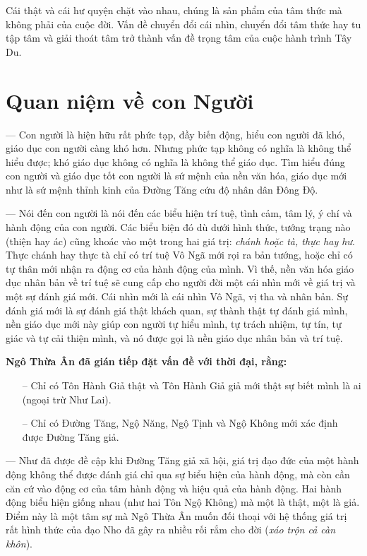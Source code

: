 Cái thật và cái hư quyện chặt vào nhau, chúng là sản phẩm của tâm thức mà không phải của cuộc đời. Vấn đề chuyển đổi cái nhìn, chuyển đổi tâm thức hay tu tập tâm và giải thoát tâm trở thành vấn đề trọng tâm của cuộc hành trình Tây Du.

\section{Quan niệm về con Người} %
\label{sec:56_57_con_nguoi}

— Con người là hiện hữu rất phức tạp, đầy biến động, hiểu con người đã khó, giáo dục con người càng khó hơn. Nhưng phức tạp không có nghĩa là không thể hiểu được; khó giáo dục không có nghĩa là không thể giáo dục. Tìm hiểu đúng con người và giáo dục tốt con người là sứ mệnh của nền văn hóa, giáo dục mới như là sứ mệnh thỉnh kinh của Đường Tăng cứu độ nhân dân Đông Độ.

— Nói đến con người là nói đến các biểu hiện trí tuệ, tình cảm, tâm lý, ý chí và hành động của con người. Các biểu biện đó dù dưới hình thức, tướng trạng nào (thiện hay ác) cũng khoác vào một trong hai giá trị: \emph{chánh hoặc tà, thực hay hư}. Thực chánh hay thực tà chỉ có trí tuệ Vô Ngã mới rọi ra bản tướng, hoặc chỉ có tự thân mới nhận ra động cơ của hành động của mình. Vì thế, nền văn hóa giáo dục nhân bản về trí tuệ sẽ cung cấp cho người đời một cái nhìn mới về giá trị và một sự đánh giá mới. Cái nhìn mới là cái nhìn Vô Ngã, vị tha và nhân bản. Sự đánh giá mới là sự đánh giá thật khách quan, sự thành thật tự đánh giá mình, nền giáo dục mới này giúp con người tự hiểu mình, tự trách nhiệm, tự tín, tự giác và tự cải thiện mình, và nó được gọi là nền giáo dục nhân bản và trí tuệ.

{\bf Ngô Thừa Ân đã gián tiếp đặt vấn đề với thời đại, rằng:}

\begin{itemize}
    \item[–] Chỉ có Tôn Hành Giả thật và Tôn Hành Giả giả mới thật sự biết mình là ai (ngoại trừ Như Lai).

    \item[–] Chỉ có Đường Tăng, Ngộ Năng, Ngộ Tịnh và Ngộ Không mới xác định được Đường Tăng giả.
\end{itemize}

— Như đã được đề cập khi Đường Tăng giả xã hội, giá trị đạo đức của một hành động không thể được đánh giá chỉ qua sự biểu hiện của hành động, mà còn cần căn cứ vào động cơ của tâm hành động và hiệu quả của hành động. Hai hành động biểu hiện giống nhau (như hai Tôn Ngộ Không) mà một là thật, một là giả. Điểm này là một tâm sự mà Ngô Thừa Ân muốn đối thoại với hệ thống giá trị rất hình thức của đạo Nho đã gây ra nhiều rối rắm cho đời (\emph{xáo trộn cả càn khôn}).

